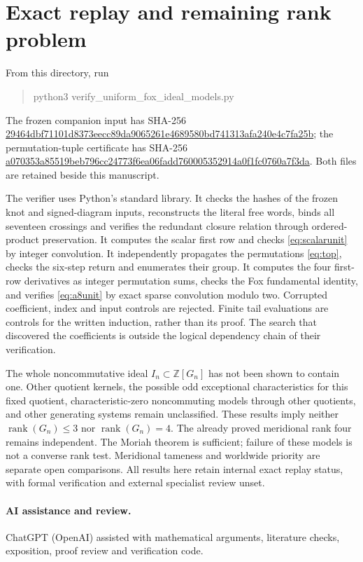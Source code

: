 \documentclass[11pt]{article}
\newcommand{\Z}{\mathbb Z}
\begin{document}
\section{Exact replay and remaining rank problem}
From this directory, run
\begin{quote}\ttfamily
python3 verify\_uniform\_fox\_ideal\_models.py
\end{quote}
The frozen companion input has SHA-256
\url{29464dbf71101d8373eecc89da9065261e4689580bd741313afa240e4c7fa25b};
the permutation-tuple certificate has SHA-256
\url{a070353a85519beb796cc24773f6ea06fadd760005352914a0f1fc0760a7f3da}.
Both files are retained beside this manuscript.

The verifier uses Python's standard library. It checks the hashes of
the frozen knot and signed-diagram inputs, reconstructs the literal
free words, binds all seventeen crossings and verifies the redundant
closure relation through ordered-product preservation. It computes
the scalar first row and checks \eqref{eq:scalarunit} by integer
convolution. It independently propagates the permutations
\eqref{eq:top}, checks the six-step return and enumerates their group.
It computes the four first-row derivatives as integer permutation
sums, checks the Fox fundamental identity, and verifies
\eqref{eq:a8unit} by exact sparse convolution modulo two.
Corrupted coefficient, index and input controls are rejected.
Finite tail evaluations are controls for the written induction, rather
than its proof. The search that discovered the coefficients is outside
the logical dependency chain of their verification.

The whole noncommutative ideal $I_n\subset\Z[G_n]$ has not been
shown to contain one. Other quotient kernels, the possible odd exceptional characteristics
for this fixed quotient, characteristic-zero noncommuting models
through other quotients, and other generating systems remain
unclassified. These results imply neither
$\operatorname{rank}(G_n)\le3$ nor $\operatorname{rank}(G_n)=4$.
The already proved meridional rank four remains independent.
The Moriah theorem is sufficient; failure of these models is not a
converse rank test. Meridional tameness and worldwide priority are
separate open comparisons. All results here retain internal exact
replay status, with formal verification and external specialist review
unset.

\paragraph{AI assistance and review.}
ChatGPT (OpenAI) assisted with mathematical arguments, literature checks,
exposition, proof review and verification code.
\end{document}
